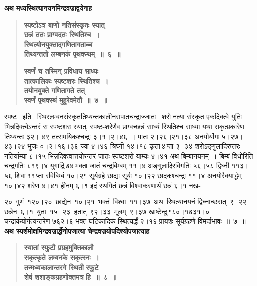 \documentclass[11pt, openany]{book}
\begin{document}
\newpage

{\small \textbf{अथ मध्यस्थित्यानयनमिन्द्रवज्राद्वयेनाह\textendash }}

 \label{5.6}
\begin{quote}
{\large \textbf{{\color{purple}स्पष्टोऽत्र बाणो नतिसंस्कृतः स्यात्\\
छन्नं ततः प्राग्वदतः स्थितिश्च~। \\
स्थित्योनयुक्ताद्गणितागताच्च \\
तिथ्यन्ततो लम्बनकं पृथक्स्थम्~॥~६~॥}}
\vspace{1mm}

 \label{5.7}
\textbf{{\color{purple}स्वर्णं च तस्मिन् प्रविधाय साध्यः\\
तात्कालिकः स्पष्टशरः स्थितिश्च~। \\
तयोनयुक्ते गणितागते तत् \\
स्वर्णं पृथक्स्थं मुहुरेवमेतौ~॥~७~॥}}}
\end{quote}

\hyperref[5.6]{स्पष्ट} ~इति ~स्थिरलम्बनसंस्कृततिथ्यन्तकालीनसपातचन्द्राज्जातः ~शरो नत्या संस्कृत एकदिक्त्वे युतिः भिन्नदिक्त्वेऽन्तरं स स्पष्टशरः स्यात्, स्पष्ट-शरेणैव प्राग्वच्छन्नं साध्यं स्थितिश्च साध्या यथा सकृत्प्रकारेण तिथ्यन्तः ३२। ४९ तत्समयिकश्चन्द्रः ३।१।२।४६~। पातः २।२६।२१।३८ अनयोर्योगः ५।२७। ४३।२४ \;भुजः \;०।२।१६।३६ \;ज्या \;४।४६ \;त्रिघ्नी \;१४।१८ \;कृता\textendash \,४\textendash \,प्ता \;३।३४ शरोऽङ्गुलादिरुत्तरः नतिर्याम्या ८।१५ भिन्नदिक्त्वात्तयोरन्तरं जातः स्पष्टशरो याम्यः ४।४१ अथ बिम्बानयनम्~। बिम्बं विधोरिति चन्द्रगतिः ८१९।४ युगाद्रि\textendash \,७४\textendash \,भक्ता जातं चन्द्रबिम्बम् ११।४ अङ्गुलादिरविगतिः ५६।५८ द्विघ्नी ११३। ५६ शिवा\textendash \,११\textendash \,प्ता रविबिम्बं १०।२१ सूर्यग्रहे छाद्यः सूर्यः १०।२२ छादकश्चन्द्रः ११।४ अनयोरैक्यार्द्धम् १०।४२ शरेण ४।४१ हीनम् ६।१ इदं स्थगितं छन्नं विश्वाकरणार्थं छन्नं ६।१ नख-

\newpage

\noindent २० \,गुणं \,१२०।२० \,छाद्येन \,१०।२१ \,भक्तं \,विश्वा \,११।३७ \,अथ \,स्थित्यानयनं द्विघ्नाच्छरात् \,९।२२ \,छन्नेन \,६।१ \,युता \,१५।२३ \,हतात् \,९२।३३ \,मूलम् \,९।३७ खाष्टेन्दु\textendash \,१८०।१७३१।०\textendash \,चन्द्रार्कयोर्गत्यन्तरेण \;७६२।६ \;भक्तं \;घटिकादिकं स्थित्यर्द्धं २।१६ प्रायशः सूर्यग्रहणे विमर्दाभावः~॥~७~॥ \\

{\small \textbf{अथ स्पर्शमोक्षमिन्द्रवज्रार्द्धेनोपजात्या चेन्द्रवज्रयोपदिश्योपजात्याह\textendash }}

 \label{5.8}
\begin{quote}
{\large \textbf{{\color{purple}स्यातां स्फुटौ प्रग्रहमुक्तिकालौ \\
सकृत्कृते लम्बनके सकृत्स्नः~। \\
तन्मध्यकालान्तरगे स्थिती स्फुटे \\
शेषं शशाङ्कग्रहणोक्तमत्र हि~॥~८~॥}}}
\end{quote}
\end{document}
